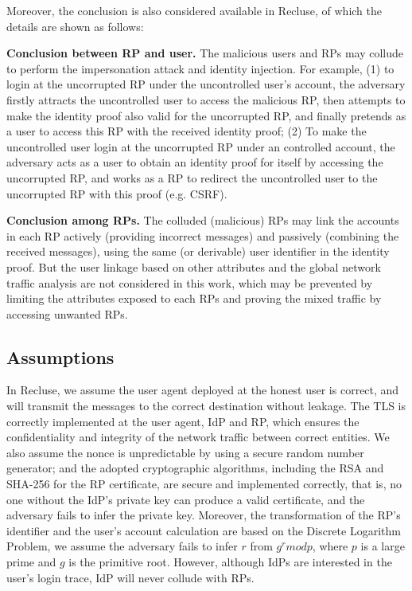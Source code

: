 Moreover, the conclusion is also considered available in Recluse, of which the details are shown as follows:

\textbf{Conclusion between RP and user.} The malicious users and RPs may collude to perform the impersonation attack and identity injection. For example, (1) to login at the uncorrupted RP under the uncontrolled user's account, the adversary firstly attracts the uncontrolled user to access the malicious RP, then attempts to make the identity proof also valid for the uncorrupted RP, and finally pretends as a user to access this RP with the received identity proof; (2) To make the uncontrolled user login at the uncorrupted RP under an controlled account, the adversary acts as a user to obtain an identity proof for itself by accessing the uncorrupted RP, and works as a RP to redirect the uncontrolled user to the uncorrupted RP with this proof (e.g. CSRF).

\textbf{Conclusion among RPs.} The colluded (malicious) RPs may link the accounts in each RP actively (providing incorrect messages) and passively (combining the received messages),  using the same (or derivable) user identifier in the identity proof. But the user linkage based on other attributes and the global network traffic analysis are not considered in this work, which may be prevented by limiting the attributes exposed to each RPs and proving the mixed traffic by accessing unwanted RPs.


\subsection{Assumptions}
In Recluse, we assume the user agent deployed at the honest user is correct, and will transmit the messages to the correct destination without leakage. The TLS is correctly implemented at the user agent, IdP and RP, which ensures the confidentiality and integrity of the network traffic between correct entities. We also assume the nonce is unpredictable by using  a secure random number generator; and the adopted cryptographic algorithms, including the RSA and SHA-256 for the RP certificate, are secure and implemented correctly, that is, no one without the IdP's private key can produce a valid certificate, and the adversary fails to infer the private key. Moreover, the transformation of the RP's identifier and the user's account calculation are based on the Discrete Logarithm Problem, we assume the adversary fails to infer $r$ from $g^r mod p$, where $p$ is a large prime and $g$ is the primitive root. However, although IdPs are interested in the user's login trace, IdP will never collude with RPs.








